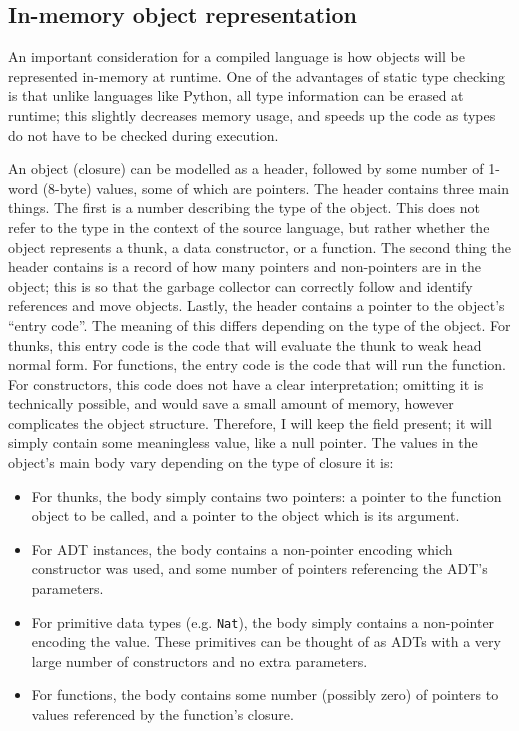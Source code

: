 \documentclass[9pt]{extarticle}
\begin{document}
\subsection{In-memory object representation}

An important consideration for a compiled language is how objects will
be represented in-memory at runtime. One of the advantages of static
type checking is that unlike languages like Python, all type information
can be erased at runtime; this slightly decreases memory usage, and
speeds up the code as types do not have to be checked during execution.

An object (closure) can be modelled as a header, followed by some number
of 1-word (8-byte) values, some of which are pointers. The header
contains three main things. The first is a number describing the type of
the object. This does not refer to the type in the context of the source
language, but rather whether the object represents a thunk, a data
constructor, or a function. The second thing the header contains is a
record of how many pointers and non-pointers are in the object; this is
so that the garbage collector can correctly follow and identify
references and move objects. Lastly, the header contains a pointer to
the object's ``entry code''. The meaning of this differs depending on
the type of the object. For thunks, this entry code is the code that
will evaluate the thunk to weak head normal form. For functions, the
entry code is the code that will run the function. For constructors,
this code does not have a clear interpretation; omitting it is
technically possible, and would save a small amount of memory, however
complicates the object structure. Therefore, I will keep the field
present; it will simply contain some meaningless value, like a null
pointer. The values in the object's main body vary depending on the type
of closure it is:

\begin{itemize}
  \item For thunks, the body simply contains two pointers: a pointer to
    the function object to be called, and a pointer to the object which
    is its argument.

  \item For ADT instances, the body contains a non-pointer encoding
    which constructor was used, and some number of pointers referencing
    the ADT's parameters.

  \item For primitive data types (e.g. \verb'Nat'), the body simply
    contains a non-pointer encoding the value. These primitives can be
    thought of as ADTs with a very large number of constructors and no
    extra parameters.

  \item For functions, the body contains some number (possibly zero) of
    pointers to values referenced by the function's closure.
\end{itemize}
\end{document}
